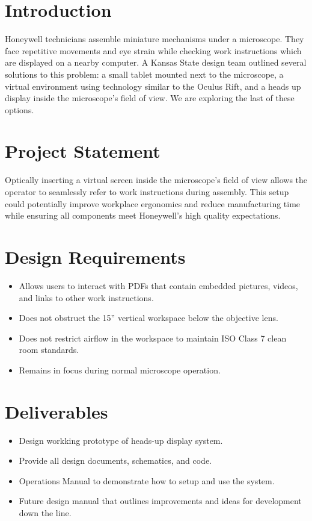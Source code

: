 \documentclass[12pt,a4paper]{article}
\begin{document}
\section{Introduction}
Honeywell technicians assemble miniature mechanisms under a microscope. They face repetitive movements and eye strain while checking work instructions which are displayed on a nearby computer. A Kansas State design team outlined several solutions to this problem: a small tablet mounted next to the microscope, a virtual environment using technology similar to the Oculus Rift, and a heads up display inside the microscope’s field of view. We are exploring the last of these options. 



\section{Project Statement}
Optically inserting a virtual screen inside the microscope’s field of view allows the operator to seamlessly refer to work instructions during assembly. This setup could potentially improve workplace ergonomics and reduce manufacturing time while ensuring all components meet Honeywell’s high quality expectations. 

\section{Design Requirements}

\begin{itemize}
	\item Allows users to interact with PDFs that contain embedded pictures, videos, and links to other work instructions.
	\item Does not obstruct the 15” vertical workspace below the objective lens.
	\item Does not restrict airflow in the workspace to maintain ISO Class 7 clean room standards.
	\item Remains in focus during normal microscope operation.
\end{itemize}

\section{Deliverables}
\begin{itemize}
	\item Design workking prototype of heads-up display system.
	\item Provide all design documents, schematics, and code.
	\item Operations Manual to demonstrate how to setup and use the system.
	\item Future design manual that outlines improvements and ideas for development down the line.
\end{itemize}
\end{document}
